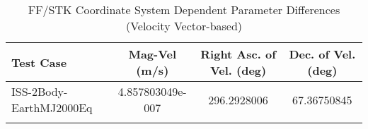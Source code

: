 \begin{table}[htbp!]
\centering
\caption{ FF/STK Coordinate System Dependent Parameter Differences (Velocity Vector-based)}
      \begin{tabular}{lccc}
      \hline\hline
          Test Case & Mag-Vel (m/s) & Right Asc. of Vel. (deg) & Dec. of Vel. (deg) \\
         \hline
         ISS-2Body-EarthMJ2000Eq & 4.857803049e-007 & 296.2928006 & 67.36750845 \\
      \hline\hline
      \label{Table: FF-STK CS Parameters Set 4} 
\end{tabular}
\end{table}
